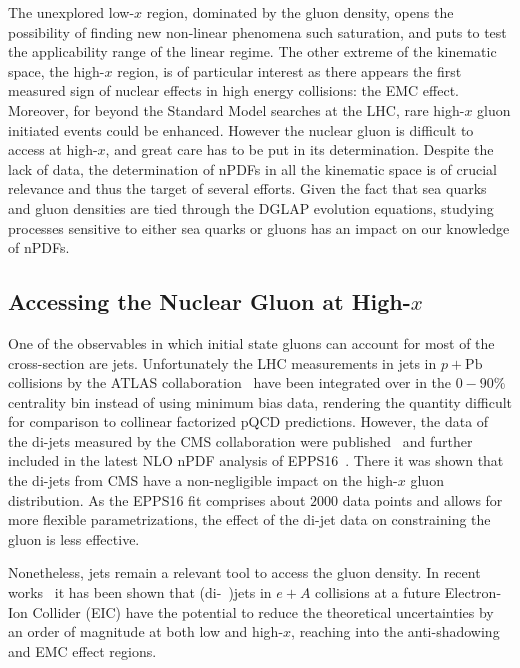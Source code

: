 The unexplored low-$x$ region, dominated by the gluon density, opens the possibility of finding new non-linear phenomena such saturation, and puts to test the applicability range of the linear regime. The other extreme of the kinematic space, the high-$x$ region, is of particular interest as there appears the first measured sign of nuclear effects in high energy collisions: the EMC effect. Moreover, for beyond the Standard Model searches at the LHC, rare high-$x$ gluon initiated events could be enhanced. However the nuclear gluon is difficult to access at high-$x$, and great care has to be put in its determination. Despite the lack of data, the determination of nPDFs in all the kinematic space is of crucial relevance and thus the target of several efforts. Given the fact that sea quarks and gluon densities are tied through the DGLAP evolution equations, studying processes sensitive to either sea quarks or gluons has an impact on our knowledge of nPDFs.    

\subsection{Accessing the Nuclear Gluon at High-$x$}

One of the observables in which initial state gluons can account for most of the cross-section are jets. Unfortunately the LHC measurements in jets in $p+\mathrm{Pb}$ collisions by the ATLAS collaboration~\cite{ATLAS:2014cpa} have been integrated over in the $0-90\%$ centrality bin instead of using minimum bias data, rendering the quantity difficult for comparison to collinear factorized pQCD predictions. However, the data of the di-jets measured by the CMS collaboration were published~\cite{Chatrchyan:2014hqa} and further included in the latest NLO nPDF analysis of EPPS16~\cite{Eskola:2016oht}. There it was shown that the di-jets from CMS have a non-negligible impact on the high-$x$ gluon distribution. As the EPPS16 fit comprises about $2000$ data points and allows for more flexible parametrizations, the effect of the di-jet data on constraining the gluon is less effective. %

Nonetheless, jets remain a relevant tool to access the gluon density. In recent works~\cite{PhysRevD.95.094013, PhysRevD.97.114013} it has been shown that (di-~)jets in $e+A$ collisions at a future Electron-Ion Collider (EIC) have the potential to reduce the theoretical uncertainties by an order of magnitude at both low and high-$x$, reaching into the anti-shadowing and EMC effect regions.

